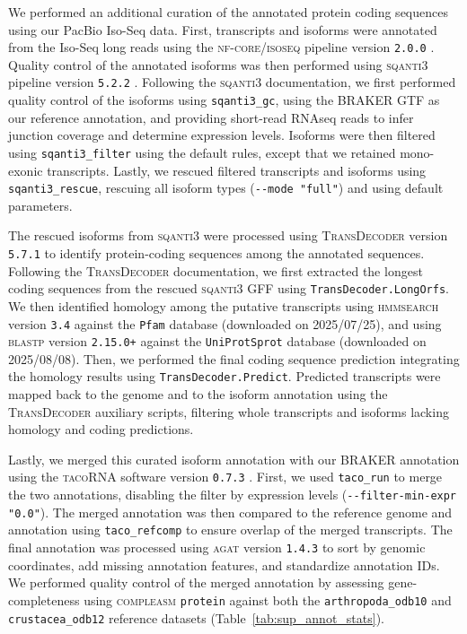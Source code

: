 We performed an additional curation of the annotated protein coding sequences using
our PacBio Iso-Seq data.
First, transcripts and isoforms were annotated from the Iso-Seq long reads using
the \textsc{nf-core/isoseq} pipeline version \texttt{2.0.0}
\citep{guizard_nf-coreisoseq_2023}.
Quality control of the annotated isoforms was then performed using \textsc{sqanti3}
pipeline version \texttt{5.2.2} \citep{pardo_sqanti3_2024}.
Following the \textsc{sqanti3} documentation, we first performed quality control
of the isoforms using \texttt{sqanti3\_gc}, using the \textsc{BRAKER} GTF as our
reference annotation, and providing short-read RNAseq reads to infer junction
coverage and determine expression levels.
Isoforms were then filtered using \texttt{sqanti3\_filter} using the default rules,
except that we retained mono-exonic transcripts.
Lastly, we rescued filtered transcripts and isoforms using \texttt{sqanti3\_rescue},
rescuing all isoform types (\texttt{-{}-mode "full"}) and using default parameters.
\vspace{0.1cm}

The rescued isoforms from \textsc{sqanti3} were processed using \textsc{TransDecoder}
version \texttt{5.7.1} \citep{hass_transdecoder} to identify protein-coding sequences
among the annotated sequences.
Following the \textsc{TransDecoder} documentation, we first extracted the longest coding
sequences from the rescued \textsc{sqanti3} GFF using \texttt{TransDecoder.LongOrfs}.
We then identified homology among the putative transcripts using \textsc{hmmsearch}
version \texttt{3.4} \citep{eddy_hmmer_2011} against the \texttt{Pfam} database
(downloaded on 2025/07/25), and using \textsc{blastp} version \texttt{2.15.0+} against
the \texttt{UniProtSprot} database (downloaded on 2025/08/08).
Then, we performed the final coding sequence prediction integrating the homology
results using \texttt{TransDecoder.Predict}.
Predicted transcripts were mapped back to the genome and to the isoform annotation
using the \textsc{TransDecoder} auxiliary scripts, filtering whole transcripts and
isoforms lacking homology and coding predictions.
\vspace{0.1cm}

Lastly, we merged this curated isoform annotation with our \textsc{BRAKER} annotation
using the \textsc{tacoRNA} software version \texttt{0.7.3} \citep{niknafs_taco_2017}.
First, we used \texttt{taco\_run} to merge the two annotations, disabling the filter
by expression levels (\texttt{-{}-filter-min-expr "0.0"}).
The merged annotation was then compared to the reference genome and annotation using
\texttt{taco\_refcomp} to ensure overlap of the merged transcripts.
The final annotation was processed using \textsc{agat} version \texttt{1.4.3}
\citep{dainat_another_2022} to sort by genomic coordinates, add missing annotation features,
and standardize annotation IDs.
We performed quality control of the merged annotation by assessing gene-completeness
using \textsc{compleasm} \texttt{protein} against both the \texttt{arthropoda\_odb10}
and \texttt{crustacea\_odb12} reference datasets (Table~\ref{tab:sup_annot_stats}).

